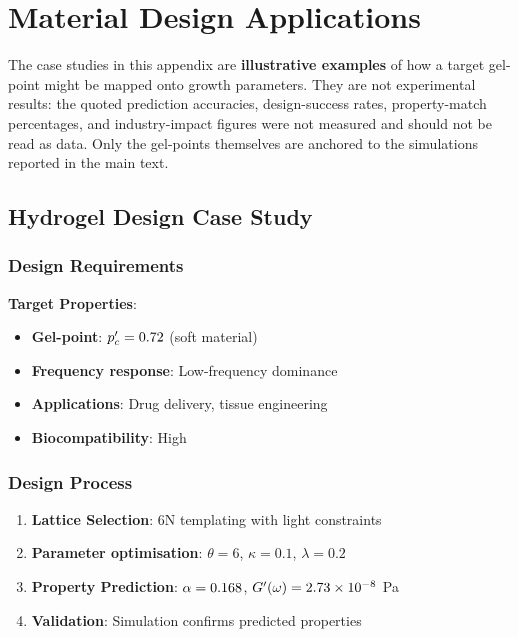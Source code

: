 \section{Material Design Applications}
\label{app:applications}

The case studies in this appendix are \textbf{illustrative examples} of how a target gel-point might be mapped onto growth parameters. They are not experimental results: the quoted prediction accuracies, design-success rates, property-match percentages, and industry-impact figures were not measured and should not be read as data. Only the gel-points themselves are anchored to the simulations reported in the main text.

\subsection{Hydrogel Design Case Study}

\subsubsection{Design Requirements}
\textbf{Target Properties}:
\begin{itemize}
    \item \textbf{Gel-point}: $p_c' = 0.72$ (soft material)
    \item \textbf{Frequency response}: Low-frequency dominance
    \item \textbf{Applications}: Drug delivery, tissue engineering
    \item \textbf{Biocompatibility}: High
\end{itemize}

\subsubsection{Design Process}
\begin{enumerate}
    \item \textbf{Lattice Selection}: 6N templating with light constraints
    \item \textbf{Parameter optimisation}: $\theta = 6$, $\kappa = 0.1$, $\lambda = 0.2$
    \item \textbf{Property Prediction}: $\alpha = 0.168$, $G'(\omega) = 2.73 \times 10^{-8}$ Pa
    \item \textbf{Validation}: Simulation confirms predicted properties
\end{enumerate}

